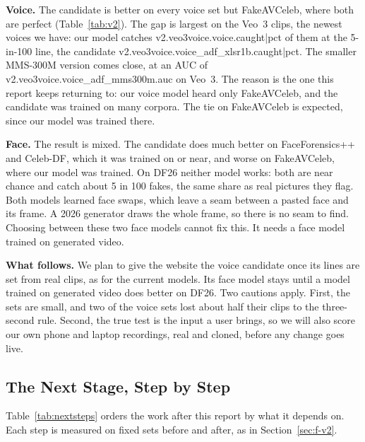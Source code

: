 \textbf{Voice.} The candidate is better on every voice set but FakeAVCeleb, where both are perfect
(Table~\ref{tab:v2}). The gap is largest on the Veo~3 clips, the newest
voices we have: our model catches {{v2.veo3voice.voice.caught|pct}} of them
at the 5-in-100 line, the candidate {{v2.veo3voice.voice_adf_xlsr1b.caught|pct}}.
The smaller MMS-300M version comes close, at an AUC of
{{v2.veo3voice.voice_adf_mms300m.auc}} on Veo~3. The reason is the one this
report keeps returning to: our voice model heard only FakeAVCeleb, and the
candidate was trained on many corpora. The tie on FakeAVCeleb is expected,
since our model was trained there.

\textbf{Face.} The result is mixed. The candidate does much better on
FaceForensics++ and Celeb-DF, which it was trained on or near, and worse on
FakeAVCeleb, where our model was trained. On DF26 neither model works: both
are near chance and catch about 5 in 100 fakes, the same share as real
pictures they flag. Both models learned face swaps, which leave a seam
between a pasted face and its frame. A 2026 generator draws the whole frame,
so there is no seam to find. Choosing between these two face models cannot
fix this. It needs a face model trained on generated video.

\textbf{What follows.} We plan to give the website the voice candidate once its
lines are set from real clips, as for the current models. Its face model stays
until a model trained on generated video does better on DF26. Two cautions
apply. First, the sets are small, and two of the voice sets lost about half their clips
to the three-second rule. Second, the true test is the input a user brings, so
we will also score our own phone and laptop recordings, real and cloned, before
any change goes live.

\subsection{The Next Stage, Step by Step}

Table~\ref{tab:nextsteps} orders the work after this report by what it
depends on. Each step is measured on fixed sets before and after, as in
Section~\ref{sec:f-v2}.


